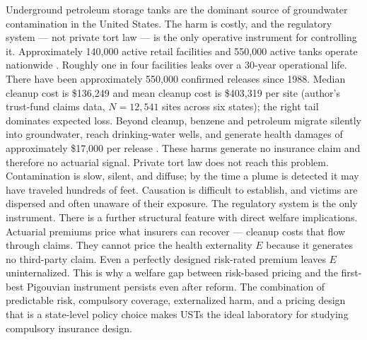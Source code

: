 \documentclass[
  12pt,
]{article}
\begin{document}
Underground petroleum storage tanks are the dominant source of
groundwater contamination in the United States. The harm is costly, and
the regulatory system --- not private tort law --- is the only operative
instrument for controlling it. Approximately 140,000 active retail
facilities and 550,000 active tanks operate nationwide \citep{epa2024}.
Roughly one in four facilities leaks over a 30-year operational life.
There have been approximately 550,000 confirmed releases since 1988.
Median cleanup cost is \$136,249 and mean cleanup cost is \$403,319 per
site (author's trust-fund claims data, \(N = 12{,}541\) sites across six
states); the right tail dominates expected loss. Beyond cleanup, benzene
and petroleum migrate silently into groundwater, reach drinking-water
wells, and generate health damages of approximately \$17,000 per release
\citep{marcus2021}. These harms generate no insurance claim and
therefore no actuarial signal. Private tort law does not reach this
problem. Contamination is slow, silent, and diffuse; by the time a plume
is detected it may have traveled hundreds of feet. Causation is
difficult to establish, and victims are dispersed and often unaware of
their exposure. The regulatory system is the only instrument. There is a
further structural feature with direct welfare implications. Actuarial
premiums price what insurers can recover --- cleanup costs that flow
through claims. They cannot price the health externality \(E\) because
it generates no third-party claim. Even a perfectly designed risk-rated
premium leaves \(E\) uninternalized. This is why a welfare gap between
risk-based pricing and the first-best Pigouvian instrument persists even
after reform. The combination of predictable risk, compulsory coverage,
externalized harm, and a pricing design that is a state-level policy
choice makes USTs the ideal laboratory for studying compulsory insurance
design.
\end{document}
